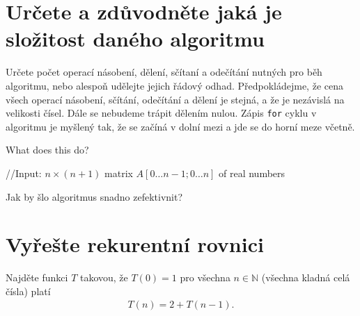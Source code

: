 \documentclass[12pt,oneside]{article}
\begin{document}
	\section{Určete a zdůvodněte jaká je složitost daného algoritmu}
	Určete počet operací násobení, dělení, sčítaní a odečítání nutných pro běh algoritmu, nebo alespoň udělejte jejich řádový odhad.
	Předpokládejme, že cena všech operací násobení, sčítání, odečítání a dělení je stejná, a že je nezávislá na velikosti čísel.
	Dále se nebudeme trápit dělením nulou.
	Zápis \verb|for| cyklu v algoritmu je myšlený tak, že se začíná v dolní mezi a jde se do horní meze včetně.
	\begin{algorithm}[h]
		\caption{What does this do?}
		\DontPrintSemicolon
		//Input: $n\times (n+1)$ matrix $A[0\dots n-1; 0 \dots n]$ of real numbers \;
		\end{algorithm}
	
	Jak by šlo algoritmus snadno zefektivnit?
	
	\section{Vyřešte rekurentní rovnici}
	Najděte funkci $T$ takovou, že $T(0) = 1$ pro všechna $n \in \mathbb{N}$ (všechna kladná celá čísla) platí
	\begin{align}
		T(n) = 2 + T(n-1).
	\end{align}
\end{document}
